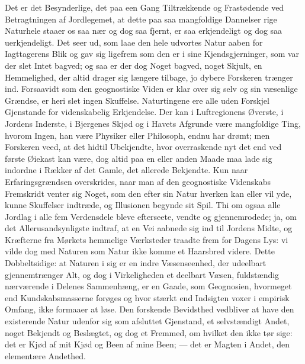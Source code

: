 \documentclass[12pt,a4paper]{book}
\begin{document}
Det er det Besynderlige, det paa een Gang Tiltrækkende og Frastødende ved
Betragtningen af Jordlegemet, at dette
paa saa mangfoldige Dannelser rige Naturhele staaer os saa nær og dog saa
fjernt, er saa erkjendeligt og dog saa uerkjendeligt. Det seer ud, som
laae den hele udvortes Natur aaben for Iagttagerens Blik og gav sig
ligefrem som den er i sine Kjendsgjerninger, som var der slet Intet
bagved; og saa er der dog Noget bagved, noget Skjult, en Hemmelighed, der
altid drager sig længere tilbage, jo dybere Forskeren trænger ind.
Forsaavidt som den geognostiske Viden er klar over sig selv og sin
væsenlige Grændse, er heri slet ingen Skuffelse. Naturtingene ere alle
uden Forskjel Gjenstande for videnskabelig Erkjendelse. Der kan i
Luftregionens Øverste, i Jordens Inderste, i Bjergenes Skjød og i Havets
Afgrunde være mangfoldige Ting, hvorom Ingen, han være Physiker eller
Philosoph, endnu har drømt; men Forskeren veed, at det hidtil Ubekjendte,
hvor overraskende nyt det end ved første Øiekast kan være, dog altid paa
en eller anden Maade maa lade sig indordne i Rækker af det Gamle, det
allerede Bekjendte. Kun naar Erfaringsgrændsen overskrides, naar man af
den geognostiske Videnskabs Fremskridt venter sig Noget, som den efter sin
Natur hverken kan eller vil yde, kunne Skuffelser indtræde, og Illusionen
begynde sit Spil. Thi om ogsaa alle Jordlag i alle fem Verdensdele bleve
efterseete, vendte og gjennemrodede; ja, om det Allerusandsynligste
indtraf, at en Vei aabnede sig ind til Jordens Midte, og Kræfterne fra
Mørkets hemmelige Værksteder traadte frem for Dagens Lys: vi vilde dog med
Naturen som Natur ikke komme et Haarsbred videre. Dette Dobbeltsidige: at
Naturen i sig er en indre Væsenseenhed, der udeelbart gjennemtrænger Alt,
og dog i Virkeligheden et deelbart Væsen, fuldstændig nærværende i Delenes
Sammenhæng, er en Gaade, som Geognosien, hvormeget end Kundskabsmasserne
forøges og hvor stærkt end Indsigten voxer i empirisk Omfang, ikke formaaer
at løse. Den forskende Bevidsthed vedbliver at have den existerende Natur
udenfor sig som afsluttet Gjenstand, et selvstændigt Andet, noget Bekjendt
og Beslægtet, og dog et Fremmed, om hvilket den ikke tør sige: det er Kjød
af mit Kjød og Been af mine Been; --- det er Magten i Andet, den
elementære Andethed.
\end{document}
